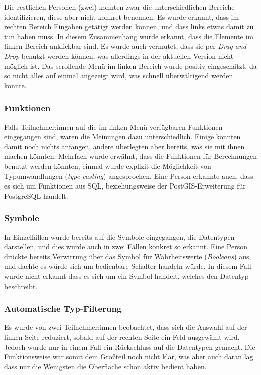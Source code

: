 Die restlichen Personen (zwei) konnten zwar die unterschiedlichen Bereiche identifizieren, diese aber nicht konkret benennen. Es wurde erkannt, dass im rechten Bereich Eingaben getätigt werden können, und dass links etwas damit zu tun haben muss. In diesem Zusammenhang wurde erkannt, dass die Elemente im linken Bereich anklickbar sind. Es wurde auch vermutet, dass sie per \textit{Drag and Drop} benutzt werden können, was allerdings in der aktuellen Version nicht möglich ist. Das scrollende Menü im linken Bereich wurde positiv eingeschätzt, da so nicht alles auf einmal angezeigt wird, was schnell überwältigend werden könnte.

\subsubsection{Funktionen}

Falls Teilnehmer:innen auf die im linken Menü verfügbaren Funktionen eingegangen sind, waren die Meinungen dazu unterschiedlich. Einige konnten damit noch nichts anfangen, andere überlegten aber bereits, was sie mit ihnen machen könnten. Mehrfach wurde erwähnt, dass die Funktionen für Berechnungen benutzt werden könnten, einmal wurde explizit die Möglichkeit von Typumwandlungen (\textit{type casting}) angesprochen. Eine Person erkannte auch, dass es sich um Funktionen aus SQL, beziehungsweise der PostGIS-Erweiterung für PostgreSQL handelt.

\subsubsection{Symbole}

In Einzelfällen wurde bereits auf die Symbole eingegangen, die Datentypen darstellen, und dies wurde auch in zwei Fällen konkret so erkannt. Eine Person drückte bereits Verwirrung über das Symbol für Wahrheitswerte (\textit{Booleans}) aus, und dachte es würde sich um bedienbare Schalter handeln würde. In diesem Fall wurde nicht erkannt dass es sich um ein Symbol handelt, welches den Datentyp beschreibt.

\subsubsection{Automatische Typ-Filterung}

Es wurde von zwei Teilnehmer:innen beobachtet, dass sich die Auswahl auf der linken Seite reduziert, sobald auf der rechten Seite ein Feld ausgewählt wird. Jedoch wurde nur in einem Fall ein Rückschluss auf die Datentypen gemacht. Die Funktionsweise war somit dem Großteil noch nicht klar, was aber auch daran lag dass nur die Wenigsten die Oberfläche schon aktiv bedient haben.

